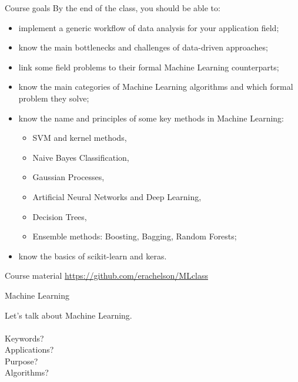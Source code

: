 \documentclass{beamer}
\begin{document}
\begin{frame}{Course goals}
\small
By the end of the class, you should be able to:
\begin{itemize}
\item implement a generic workflow of data analysis for your application field;
\item know the main bottlenecks and challenges of data-driven approaches;
\item link some field problems to their formal Machine Learning counterparts;
\item know the main categories of Machine Learning algorithms and which formal problem they solve;
\item know the name and principles of some key methods in Machine Learning:
\begin{itemize}
\item SVM and kernel methods,
\item Naive Bayes Classification,
\item Gaussian Processes,
\item Artificial Neural Networks and Deep Learning,
\item Decision Trees,
\item Ensemble methods: Boosting, Bagging, Random Forests;
\end{itemize} 
\item know the basics of scikit-learn and keras.
\end{itemize}
\end{frame}

\begin{frame}{Course material}
\small\url{https://github.com/erachelson/MLclass}
\end{frame}

\begin{frame}{Machine Learning}
\begin{center}
Let's talk about Machine Learning.\\
~\\
Keywords?\\
Applications?\\
Purpose?\\
Algorithms?
\end{center}
\end{frame}
\end{document}
